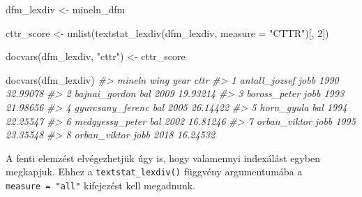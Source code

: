\documentclass[
]{book}
\newenvironment{Shaded}{\begin{snugshade}}{\end{snugshade}}
\newcommand{\AttributeTok}[1]{\textcolor[rgb]{0.77,0.63,0.00}{#1}}
\newcommand{\CommentTok}[1]{\textcolor[rgb]{0.56,0.35,0.01}{\textit{#1}}}
\newcommand{\DecValTok}[1]{\textcolor[rgb]{0.00,0.00,0.81}{#1}}
\newcommand{\FunctionTok}[1]{\textcolor[rgb]{0.00,0.00,0.00}{#1}}
\newcommand{\NormalTok}[1]{#1}
\newcommand{\OtherTok}[1]{\textcolor[rgb]{0.56,0.35,0.01}{#1}}
\newcommand{\StringTok}[1]{\textcolor[rgb]{0.31,0.60,0.02}{#1}}
\begin{document}
\begin{Shaded}
\begin{Highlighting}[]
\NormalTok{dfm\_lexdiv }\OtherTok{\textless{}{-}}\NormalTok{ mineln\_dfm}

\NormalTok{cttr\_score }\OtherTok{\textless{}{-}} \FunctionTok{unlist}\NormalTok{(}\FunctionTok{textstat\_lexdiv}\NormalTok{(dfm\_lexdiv, }\AttributeTok{measure =} \StringTok{"CTTR"}\NormalTok{)[, }\DecValTok{2}\NormalTok{])}

\FunctionTok{docvars}\NormalTok{(dfm\_lexdiv, }\StringTok{"cttr"}\NormalTok{) }\OtherTok{\textless{}{-}}\NormalTok{ cttr\_score}

\FunctionTok{docvars}\NormalTok{(dfm\_lexdiv)}
\CommentTok{\#\textgreater{}             mineln wing year     cttr}
\CommentTok{\#\textgreater{} 1    antall\_jozsef jobb 1990 32.99078}
\CommentTok{\#\textgreater{} 2    bajnai\_gordon  bal 2009 19.93214}
\CommentTok{\#\textgreater{} 3     boross\_peter jobb 1993 21.98656}
\CommentTok{\#\textgreater{} 4 gyurcsany\_ferenc  bal 2005 26.14422}
\CommentTok{\#\textgreater{} 5       horn\_gyula  bal 1994 22.25547}
\CommentTok{\#\textgreater{} 6  medgyessy\_peter  bal 2002 16.81246}
\CommentTok{\#\textgreater{} 7     orban\_viktor jobb 1995 23.35548}
\CommentTok{\#\textgreater{} 8     orban\_viktor jobb 2018 16.24532}
\end{Highlighting}
\end{Shaded}

A fenti elemzést elvégezhetjük úgy is, hogy valamennyi indexálást egyben
megkapjuk. Ehhez a \texttt{textstat\_lexdiv()} függvény argumentumába a
\texttt{measure\ =\ "all"} kifejezést kell megadnunk.
\end{document}
